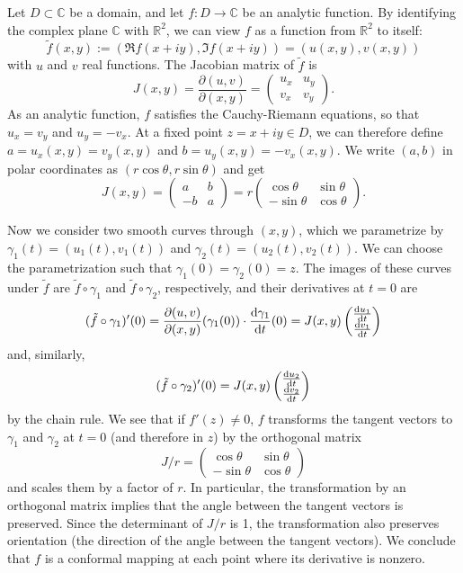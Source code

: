 \documentclass[12pt]{article}
\begin{document}
Let $D\subset\mathbb{C}$ be a domain, and let $f\colon D\to\mathbb{C}$ be an
analytic function.  By identifying the complex plane $\mathbb{C}$ with
$\mathbb{R}^2$, we can view $f$ as a function from $\mathbb{R}^2$ to
itself:
$$
\tilde f(x,y):=(\Re f(x+iy), \Im f(x+iy))=(u(x,y),v(x,y))
$$
with $u$ and $v$ real functions.  The Jacobian matrix of $\tilde f$ is
$$
J(x,y)=\frac{\partial(u,v)}{\partial(x,y)}=\begin{pmatrix}
u_x & u_y \\
v_x & v_y
\end{pmatrix}.
$$
As an analytic function, $f$ satisfies the Cauchy-Riemann equations,
so that $u_x=v_y$ and $u_y=-v_x$.  At a fixed point $z=x+iy\in D$, we
can therefore define $a=u_x(x,y)=v_y(x,y)$ and $b=u_y(x,y)=-v_x(x,y)$.
We write $(a,b)$ in polar coordinates as $(r\cos\theta,r\sin\theta)$
and get
$$
J(x,y)=\begin{pmatrix}
a & b \\
-b & a
\end{pmatrix} = r\begin{pmatrix}
\cos\theta & \sin\theta \\
-\sin\theta & \cos\theta
\end{pmatrix}.
$$

Now we consider two smooth curves through $(x,y)$, which we
parametrize by $\gamma_1(t)=(u_1(t),v_1(t))$ and
$\gamma_2(t)=(u_2(t),v_2(t))$.  We can choose the parametrization such
that $\gamma_1(0)=\gamma_2(0)=z$.  The images of these curves under
$\tilde f$ are $\tilde f\circ\gamma_1$ and $\tilde f\circ\gamma_2$,
respectively, and their derivatives at $t=0$ are
$$
(\tilde f\circ\gamma_1)'(0)=
\frac{\partial(u,v)}{\partial(x,y)}(\gamma_1(0))
\cdot \frac{{\rm d}\gamma_1}{{\rm d}t}(0)=
J(x,y)\begin{pmatrix}
\frac{{\rm d}u_1}{{\rm d}t} \\
\frac{{\rm d}v_1}{{\rm d}t}
\end{pmatrix}
$$
and, similarly,
$$
(\tilde f\circ\gamma_2)'(0)=J(x,y)\begin{pmatrix}
\frac{{\rm d}u_2}{{\rm d}t} \\
\frac{{\rm d}v_2}{{\rm d}t}
\end{pmatrix}
$$
by the chain rule.  We see that if $f'(z)\neq 0$, $f$ transforms the
tangent vectors to $\gamma_1$ and $\gamma_2$ at $t=0$ (and therefore
in $z$) by the orthogonal matrix
$$
J/r=\begin{pmatrix}
\cos\theta & \sin\theta \\
-\sin\theta & \cos\theta
\end{pmatrix}
$$
and scales them by a factor of $r$.  In particular, the transformation
by an orthogonal matrix implies that the angle between the tangent
vectors is preserved.  Since the determinant of $J/r$ is 1, the
transformation also preserves orientation (the direction of the angle
between the tangent vectors).  We conclude that $f$ is a conformal
mapping at each point where its derivative is nonzero.
\end{document}
